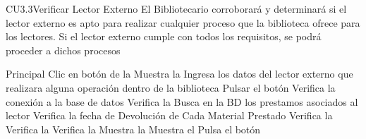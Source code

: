 
	\begin{UseCase}{CU3.3}{Verificar Lector Externo}{
		El Bibliotecario corroborará y determinará si el lector externo es apto para realizar cualquier proceso que la biblioteca ofrece para los lectores. Si el lector externo cumple con todos los requisitos, se podrá proceder a dichos procesos
	}
	\end{UseCase}
	\begin{UCtrayectoria}{Principal}
		\UCpaso[\UCactor] Clic en botón  de la 
		\UCpaso[\UCsist] Muestra la 
		\UCpaso[\UCactor] Ingresa los datos del lector externo que realizara alguna operación dentro de la biblioteca
		\UCpaso[\UCactor] Pulsar el botón 
		\UCpaso[\UCsist] Verifica la conexión a la base de datos 
		\UCpaso[\UCsist] Verifica la  
		\UCpaso[\UCsist] Busca en la BD los prestamos asociados al lector
		\UCpaso[\UCsist] Verifica la fecha de Devolución de Cada Material Prestado
		\UCpaso[\UCsist] Verifica la  
		\UCpaso[\UCsist] Verifica la  
		\UCpaso[\UCsist] Verifica la  
		\UCpaso[\UCsist] Muestra la 
		\UCpaso[\UCsist] Muestra el 
		\UCpaso[\UCactor] Pulsa el botón  
 
	\end{UCtrayectoria}

